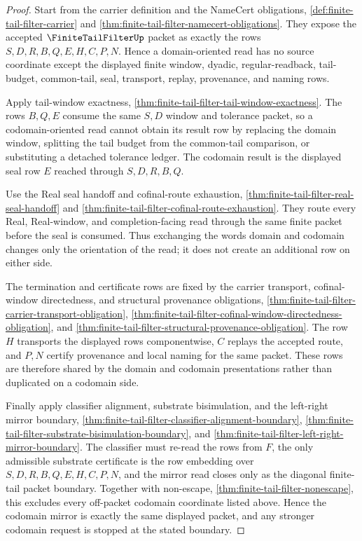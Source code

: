 \begin{proof}
Start from the carrier definition and the NameCert obligations, \autoref{def:finite-tail-filter-carrier} and \autoref{thm:finite-tail-filter-namecert-obligations}. They expose the accepted $\FiniteTailFilterUp$ packet as exactly the rows $S,D,R,B,Q,E,H,C,P,N$. Hence a domain-oriented read has no source coordinate except the displayed finite window, dyadic, regular-readback, tail-budget, common-tail, seal, transport, replay, provenance, and naming rows.

Apply tail-window exactness, \autoref{thm:finite-tail-filter-tail-window-exactness}. The rows $B,Q,E$ consume the same $S,D$ window and tolerance packet, so a codomain-oriented read cannot obtain its result row by replacing the domain window, splitting the tail budget from the common-tail comparison, or substituting a detached tolerance ledger. The codomain result is the displayed seal row $E$ reached through $S,D,R,B,Q$.

Use the Real seal handoff and cofinal-route exhaustion, \autoref{thm:finite-tail-filter-real-seal-handoff} and \autoref{thm:finite-tail-filter-cofinal-route-exhaustion}. They route every Real, Real-window, and completion-facing read through the same finite packet before the seal is consumed. Thus exchanging the words domain and codomain changes only the orientation of the read; it does not create an additional row on either side.

The termination and certificate rows are fixed by the carrier transport, cofinal-window directedness, and structural provenance obligations, \autoref{thm:finite-tail-filter-carrier-transport-obligation}, \autoref{thm:finite-tail-filter-cofinal-window-directedness-obligation}, and \autoref{thm:finite-tail-filter-structural-provenance-obligation}. The row $H$ transports the displayed rows componentwise, $C$ replays the accepted route, and $P,N$ certify provenance and local naming for the same packet. These rows are therefore shared by the domain and codomain presentations rather than duplicated on a codomain side.

Finally apply classifier alignment, substrate bisimulation, and the left-right mirror boundary, \autoref{thm:finite-tail-filter-classifier-alignment-boundary}, \autoref{thm:finite-tail-filter-substrate-bisimulation-boundary}, and \autoref{thm:finite-tail-filter-left-right-mirror-boundary}. The classifier must re-read the rows from $F$, the only admissible substrate certificate is the row embedding over $S,D,R,B,Q,E,H,C,P,N$, and the mirror read closes only as the diagonal finite-tail packet boundary. Together with non-escape, \autoref{thm:finite-tail-filter-nonescape}, this excludes every off-packet codomain coordinate listed above. Hence the codomain mirror is exactly the same displayed packet, and any stronger codomain request is stopped at the stated boundary.
\end{proof}
